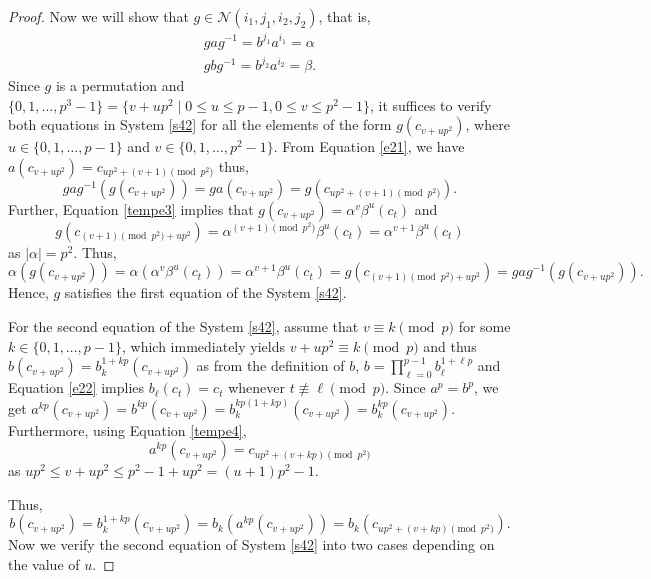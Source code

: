 \documentclass[10pt,a4paper]{amsart}
\begin{document}
\begin{proof}
 Now we will show that $g \in \mathcal{N}(i_1,j_1,i_2,j_2)$, that is, 
  \begin{equation}\label{s42}
  \begin{split}
  gag^{-1}=b^{j_1}a^{i_1}=\alpha \\
  gbg^{-1}=b^{j_2}a^{i_2}=\beta.
  \end{split}
  \end{equation} 
  Since $g$ is a permutation and $\{0,1,\ldots,p^3-1\}=\{v+up^2 \mid 0 \leq u \leq p-1, 0 \leq v \leq p^2-1\}$, it suffices to verify both equations in System \eqref{s42} for all the elements of the form $g(c_{v+up^2})$, where $u \in \{0,1,\ldots,p-1\}$ and $v \in \{0,1,\ldots,p^2-1\}$.  From Equation \eqref{e21}, we have $a(c_{v+up^2})=c_{up^2+(v+1) \pmod {p^2}}$ thus, 
  $$gag^{-1}(g(c_{v+up^2}))=ga(c_{v+up^2})=g(c_{up^2+(v+1) \pmod {p^2}}).$$ 
Further, Equation \eqref{tempe3} implies that $g(c_{v+up^2})=\alpha^{v}\beta^{u}(c_t)$ and $$g(c_{(v+1) \pmod {p^2}+up^2})=\alpha^{(v+1) \pmod {p^2}}\beta^{u}(c_t)=\alpha^{v+1}\beta^{u}(c_t)$$ as $|\alpha|=p^2$.
Thus,
 \[
 \alpha(g(c_{v+up^2}))= \alpha(\alpha^{v}\beta^{u}(c_t))=\alpha^{v+1}\beta^{u}(c_t)=g(c_{(v+1) \pmod {p^2}+up^2})=gag^{-1}(g(c_{v+up^2})).
 \]
 Hence, $g$ satisfies the first equation of the System \eqref{s42}. 
 
 For the second equation of the System \eqref{s42}, assume that $v \equiv k \pmod  p$ for some $k \in \{0,1,\ldots,p-1\}$, which immediately yields  $v+up^2 \equiv k \pmod  p$ and thus $b(c_{v+up^2})=b_k^{1+kp}(c_{v+up^2})$ as from the definition of $b$, $b=\displaystyle \prod_{\ell=0}^{p-1}b_{\ell}^{1+\ell p}$ and Equation \eqref{e22} implies $b_{\ell}(c_t)=c_t$ whenever $t \not \equiv \ell \pmod  p$. %
 Since $a^p=b^p$, we get $a^{kp}(c_{v+up^2})=b^{kp}(c_{v+up^2})=b_k^{kp(1+kp)}(c_{v+up^2})=b_k^{kp}(c_{v+up^2}).$  Furthermore, using Equation \eqref{tempe4}, 
 $$a^{kp}(c_{v+up^2})=c_{up^2+(v+kp)\pmod {p^2}}$$
as $up^2\leq v+up^2 \leq p^2-1+up^2 =(u+1)p^2-1$.

Thus, 
\begin{equation}\label{R43}
b(c_{v+up^2})=b_k^{1+kp}(c_{v+up^2})=b_k(a^{kp}(c_{v+up^2}))=b_k(c_{up^2+(v+kp)\pmod {p^2}}).
\end{equation}
Now we verify the second equation of System \eqref{s42} into two cases depending on the value of $u$.
 

\end{proof}
\end{document}
